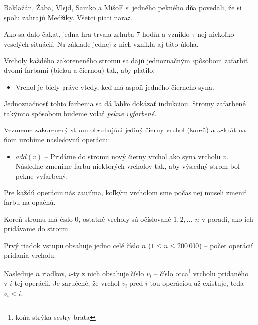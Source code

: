 

\usepackage[slovak]{babel}





Baklažán, Žaba, Vlejd, Samko a MišoF si jedného pekného dňa povedali,
že si spolu zahrajú Medžiky. Všetci piati naraz.

Ako sa dalo čakať, jedna hra trvala zrhuba 7 hodín a vzniklo v nej niekoľko
veselých situácií. Na základe jednej z nich vznikla aj táto úloha.


Vrcholy každého zakoreneného stromu sa dajú jednoznačným spôsobom zafarbiť dvomi
farbami (bielou a čiernou) tak, aby platilo:

\begin{itemize}
\item Vrchol je biely práve vtedy, keď má aspoň jedného čierneho syna.
\end{itemize}

Jednoznačnosť tohto farbenia sa dá ľahko dokázať indukciou. Stromy zafarbené takýmto
spôsobom budeme volať \emph{pekne vyfarbené}.

Vezmeme zakorenený strom obsahujúci jediný čierny vrchol (koreň) a $n$-krát na
ňom urobíme nasledovnú operáciu:

\begin{itemize}
\item $add(v)$ -- Pridáme do stromu nový čierny vrchol ako syna vrcholu $v$. Následne zmeníme farbu
                  niektorých vrcholov tak, aby výsledný strom bol pekne vyfarbený.
\end{itemize}

Pre každú operáciu nás zaujíma, koľkým vrcholom sme počas nej museli zmeniť farbu na opačnú.


Koreň stromu má číslo $0$, ostatné vrcholy sú očíslované $1, 2, \dots, n$ v poradí, ako ich
pridávame do stromu.

Prvý riadok vstupu obsahuje jedno celé číslo $n$ ($1 \leq n \leq 200\,000$) -- počet operácií
pridania vrcholu.

Nasleduje $n$ riadkov, $i$-ty z nich obsahuje číslo $v_i$ -- číslo otca\footnote{koňa strýka sestry brata} vrcholu pridaného v $i$-tej operácii. Je zaručené, že vrchol $v_i$ pred $i$-tou operáciou
už existuje, teda $v_i < i$.

